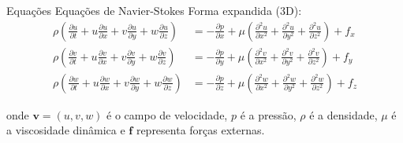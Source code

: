 \begin{frame}{Equações}
    Equações de Navier-Stokes Forma expandida (3D):
    \footnotesize
        \begin{align*}
            \rho\left(\frac{\partial u}{\partial t} + u\frac{\partial u}{\partial x} + v\frac{\partial u}{\partial y} + w\frac{\partial u}{\partial z}\right) &= -\frac{\partial p}{\partial x} + \mu\left(\frac{\partial^2 u}{\partial x^2} + \frac{\partial^2 u}{\partial y^2} + \frac{\partial^2 u}{\partial z^2}\right) + f_x \\[0.3cm]
            \rho\left(\frac{\partial v}{\partial t} + u\frac{\partial v}{\partial x} + v\frac{\partial v}{\partial y} + w\frac{\partial v}{\partial z}\right) &= -\frac{\partial p}{\partial y} + \mu\left(\frac{\partial^2 v}{\partial x^2} + \frac{\partial^2 v}{\partial y^2} + \frac{\partial^2 v}{\partial z^2}\right) + f_y \\[0.3cm]
            \rho\left(\frac{\partial w}{\partial t} + u\frac{\partial w}{\partial x} + v\frac{\partial w}{\partial y} + w\frac{\partial w}{\partial z}\right) &= -\frac{\partial p}{\partial z} + \mu\left(\frac{\partial^2 w}{\partial x^2} + \frac{\partial^2 w}{\partial y^2} + \frac{\partial^2 w}{\partial z^2}\right) + f_z
        \end{align*}
        
    onde $\mathbf{v} = (u,v,w)$ é o campo de velocidade, $p$ é a pressão, $\rho$ é a densidade, $\mu$ é a viscosidade dinâmica e $\mathbf{f}$ representa forças externas.
\end{frame}
